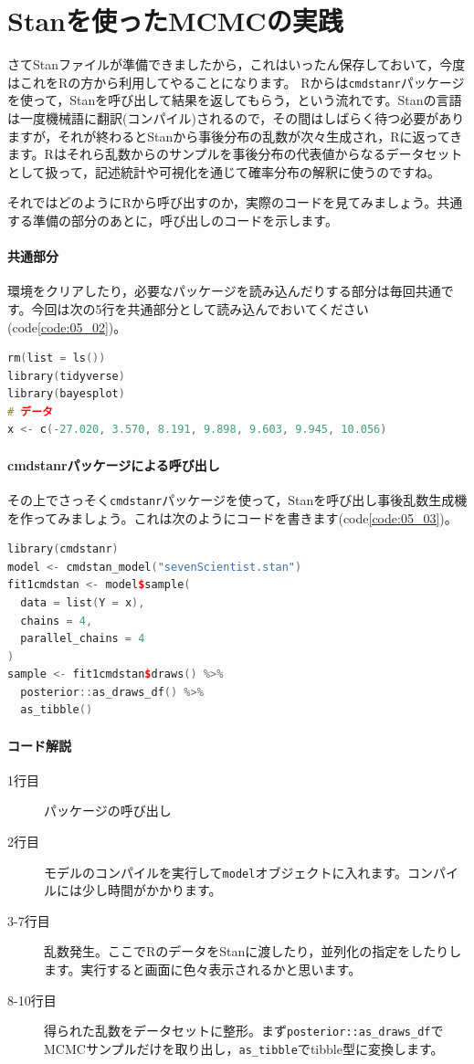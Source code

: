 \documentclass{ltjsbook}
\begin{document}
\section{Stanを使ったMCMCの実践}
さてStanファイルが準備できましたから，これはいったん保存しておいて，今度はこれをRの方から利用してやることになります。
Rからは\texttt{cmdstanr}パッケージを使って，Stanを呼び出して結果を返してもらう，という流れです。Stanの言語は一度機械語に翻訳(コンパイル)されるので，その間はしばらく待つ必要がありますが，それが終わるとStanから事後分布の乱数が次々生成され，Rに返ってきます。Rはそれら乱数からのサンプルを事後分布の代表値からなるデータセットとして扱って，記述統計や可視化を通じて確率分布の解釈に使うのですね。

それではどのようにRから呼び出すのか，実際のコードを見てみましょう。共通する準備の部分のあとに，呼び出しのコードを示します。
\paragraph{共通部分}
環境をクリアしたり，必要なパッケージを読み込んだりする部分は毎回共通です。今回は次の5行を共通部分として読み込んでおいてください(code\ref{code:05_02})。

\begin{lstlisting}[language=C++,label={code:05_02},caption={環境の準備と共通部分}]
rm(list = ls())
library(tidyverse)
library(bayesplot)
# データ
x <- c(-27.020, 3.570, 8.191, 9.898, 9.603, 9.945, 10.056)
\end{lstlisting}

\paragraph{cmdstanrパッケージによる呼び出し}

その上でさっそく\texttt{cmdstanr}パッケージを使って，Stanを呼び出し事後乱数生成機を作ってみましょう。これは次のようにコードを書きます(code\ref{code:05_03})。

\begin{lstlisting}[language=C++,label={code:05_03},caption={cmdstanrパッケージによる呼び出し}]
library(cmdstanr)
model <- cmdstan_model("sevenScientist.stan")
fit1cmdstan <- model$sample(
  data = list(Y = x),
  chains = 4,
  parallel_chains = 4
)
sample <- fit1cmdstan$draws() %>% 
  posterior::as_draws_df() %>% 
  as_tibble()
\end{lstlisting}
\paragraph{コード解説}
\begin{description}
	\item[1行目] パッケージの呼び出し
	\item[2行目] モデルのコンパイルを実行して\texttt{model}オブジェクトに入れます。コンパイルには少し時間がかかります。
	\item[3-7行目] 乱数発生。ここでRのデータをStanに渡したり，並列化の指定をしたりします。実行すると画面に色々表示されるかと思います。
	\item[8-10行目] 得られた乱数をデータセットに整形。まず\verb|posterior::as_draws_df|でMCMCサンプルだけを取り出し，\verb|as_tibble|でtibble型に変換します。
\end{description}
\end{document}
